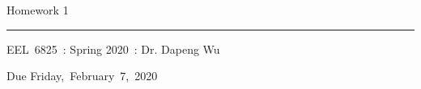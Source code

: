 \documentclass[fleqn]{article}
\newcommand{\myCourse}{EEL\ 6825}
\newcommand{\mySection}{Spring 2020}
\newcommand{\myTeacher}{Dr. Dapeng Wu}
\newcommand{\myAssignment}{Homework 1}
\newcommand{\myDueDate}{Friday,\ February\ 7,\ 2020}
\begin{document}
\title{\vspace{-1in}} %
\author{} %
\date{} %
\maketitle %

\usebox{\myTitleSignature}
\vspace{1in} %

{\centering \huge \myAssignment \par}
{\centering \noindent\rule{4in}{0.1pt} \par}
\vspace{0.05in}
{\centering \myCourse~: \mySection~: \myTeacher \par}
{\centering Due \myDueDate \par}
\vspace{1in}

\tableofcontents
\newpage

\end{document}
